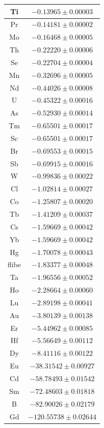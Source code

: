 \documentclass[11pt]{article}
\begin{document}
\begin{table}[ht]
\begin{tabular}{| c | c |}
    Ti                &   $-0.13965\pm0.00003$ \\ \hline
    Pr                &   $-0.14181\pm0.00002$ \\ \hline
    Mo                &   $-0.16468\pm0.00005$ \\ \hline
    Th                &   $-0.22220\pm0.00006$ \\ \hline
    Se                &   $-0.22704\pm0.00004$ \\ \hline
    Mn                &   $-0.32696\pm0.00005$ \\ \hline
    Nd                &   $-0.44026\pm0.00008$ \\ \hline
    U                 &   $-0.45322\pm0.00016$ \\ \hline
    As                &   $-0.52930\pm0.00014$ \\ \hline
    Tm                &   $-0.65501\pm0.00017$ \\ \hline
    Sc                &   $-0.65501\pm0.00017$ \\ \hline
    Br                &   $-0.69553\pm0.00015$ \\ \hline
    Sb                &   $-0.69915\pm0.00016$ \\ \hline
    W                 &   $-0.99836\pm0.00022$ \\ \hline
    Cl                &   $-1.02814\pm0.00027$ \\ \hline
    Co                &   $-1.25807\pm0.00020$ \\ \hline
    Tb                &   $-1.41209\pm0.00037$ \\ \hline
    Cs                &   $-1.59669\pm0.00042$ \\ \hline
    Yb                &   $-1.59669\pm0.00042$ \\ \hline
    Hg                &   $-1.70078\pm0.00043$ \\ \hline
    flibe             &   $-1.83377\pm0.00048$ \\ \hline
    Ta                &   $-1.96556\pm0.00052$ \\ \hline
    Ho                &   $-2.28664\pm0.00060$ \\ \hline
    Lu                &   $-2.89198\pm0.00041$ \\ \hline
    Au                &   $-3.80139\pm0.00138$ \\ \hline
    Er                &   $-5.44962\pm0.00085$ \\ \hline
    Hf                &   $-5.56649\pm0.00112$ \\ \hline
    Dy                &   $-8.41116\pm0.00122$ \\ \hline
    Eu                &  $-38.31542\pm0.00927$ \\ \hline
    Cd                &  $-58.78493\pm0.01542$ \\ \hline
    Sm                &  $-72.48603\pm0.01818$ \\ \hline
    B                 &  $-82.90026\pm0.02179$ \\ \hline
    Gd                & $-120.55738\pm0.02644$ \\ \hline
    \end{tabular}
\end{table}
\end{document}
